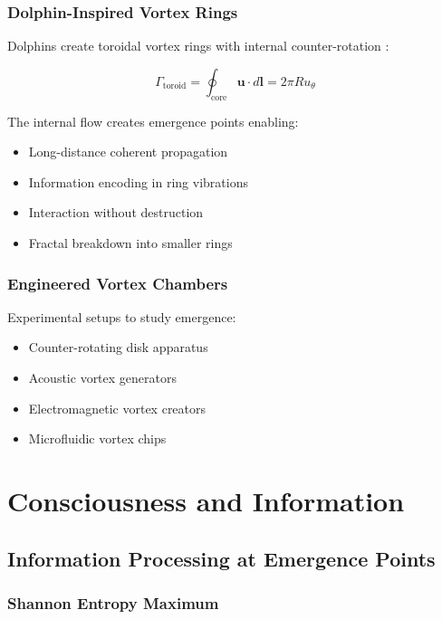 \documentclass[12pt]{article}
\begin{document}
\subsubsection{Dolphin-Inspired Vortex Rings}

Dolphins create toroidal vortex rings with internal counter-rotation \cite{linden2010}:

\begin{equation}
\Gamma_{\text{toroid}} = \oint_{\text{core}} \mathbf{u} \cdot d\mathbf{l} = 2\pi R u_\theta
\end{equation}

The internal flow creates emergence points enabling:
\begin{itemize}
\item Long-distance coherent propagation
\item Information encoding in ring vibrations
\item Interaction without destruction
\item Fractal breakdown into smaller rings
\end{itemize}

\subsubsection{Engineered Vortex Chambers}

Experimental setups to study emergence:
\begin{itemize}
\item Counter-rotating disk apparatus
\item Acoustic vortex generators
\item Electromagnetic vortex creators
\item Microfluidic vortex chips
\end{itemize}

\section{Consciousness and Information}

\subsection{Information Processing at Emergence Points}

\subsubsection{Shannon Entropy Maximum}
\end{document}
